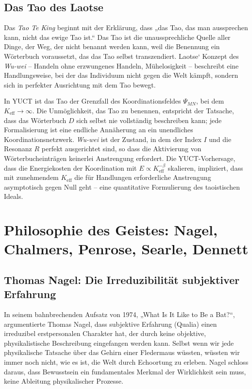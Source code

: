 \documentclass[12pt,a4paper]{article}
\begin{document}
	\subsection{Das Tao des Laotse}
	
	Das \emph{Tao Te King} beginnt mit der Erklärung, dass „das Tao, das man aussprechen kann, nicht das ewige Tao ist.“ Das Tao ist die unaussprechliche Quelle aller Dinge, der Weg, der nicht benannt werden kann, weil die Benennung ein Wörterbuch voraussetzt, das das Tao selbst transzendiert. Laotse‘ Konzept des \emph{Wu-wei} – Handeln ohne erzwungenes Handeln, Mühelosigkeit – beschreibt eine Handlungsweise, bei der das Individuum nicht gegen die Welt kämpft, sondern sich in perfekter Ausrichtung mit dem Tao bewegt.
	
	In YUCT ist das Tao der Grenzfall des Koordinationsfeldes \(\Psi_{MN}\), bei dem \(K_{\mathrm{eff}} \to \infty\). Die Unmöglichkeit, das Tao zu benennen, entspricht der Tatsache, dass das Wörterbuch \(D\) sich selbst nie vollständig beschreiben kann; jede Formalisierung ist eine endliche Annäherung an ein unendliches Koordinationsnetzwerk. \emph{Wu-wei} ist der Zustand, in dem der Index \(I\) und die Resonanz \(R\) perfekt ausgerichtet sind, so dass die Aktivierung von Wörterbucheinträgen keinerlei Anstrengung erfordert. Die YUCT-Vorhersage, dass die Energiekosten der Koordination mit \(E \propto K_{\mathrm{eff}}^{-\beta}\) skalieren, impliziert, dass mit zunehmendem \(K_{\mathrm{eff}}\) die für Handlungen erforderliche Anstrengung asymptotisch gegen Null geht – eine quantitative Formulierung des taoistischen Ideals.
	
	\section{Philosophie des Geistes: Nagel, Chalmers, Penrose, Searle, Dennett}
	
	\subsection{Thomas Nagel: Die Irreduzibilität subjektiver Erfahrung}
	
	In seinem bahnbrechenden Aufsatz von 1974, „What Is It Like to Be a Bat?“, argumentierte Thomas Nagel, dass subjektive Erfahrung (Qualia) einen irreduzibel erstpersonalen Charakter hat, der durch keine objektive, physikalistische Beschreibung eingefangen werden kann. Selbst wenn wir jede physikalische Tatsache über das Gehirn einer Fledermaus wüssten, wüssten wir immer noch nicht, wie es ist, die Welt durch Echoortung zu erleben. Nagel schloss daraus, dass Bewusstsein ein fundamentales Merkmal der Wirklichkeit sein muss, keine Ableitung physikalischer Prozesse.
	
\end{document}
